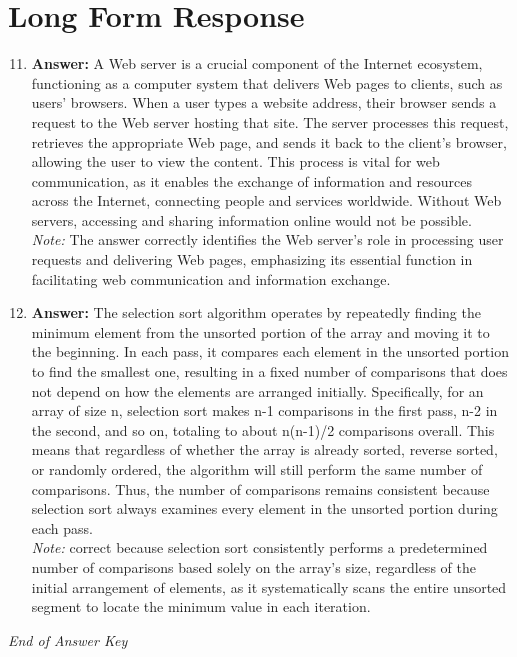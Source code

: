 \documentclass[12pt]{article}
\begin{document}
\section*{Long Form Response}
\begin{enumerate}[label=\arabic*.]
\setcounter{enumi}{10}
\item \textbf{Answer:} A Web server is a crucial component of the Internet ecosystem, functioning as a computer system that delivers Web pages to clients, such as users' browsers. When a user types a website address, their browser sends a request to the Web server hosting that site. The server processes this request, retrieves the appropriate Web page, and sends it back to the client's browser, allowing the user to view the content. This process is vital for web communication, as it enables the exchange of information and resources across the Internet, connecting people and services worldwide. Without Web servers, accessing and sharing information online would not be possible.
\\ \textit{Note:} The answer correctly identifies the Web server's role in processing user requests and delivering Web pages, emphasizing its essential function in facilitating web communication and information exchange.
\item \textbf{Answer:} The selection sort algorithm operates by repeatedly finding the minimum element from the unsorted portion of the array and moving it to the beginning. In each pass, it compares each element in the unsorted portion to find the smallest one, resulting in a fixed number of comparisons that does not depend on how the elements are arranged initially. Specifically, for an array of size n, selection sort makes n-1 comparisons in the first pass, n-2 in the second, and so on, totaling to about n(n-1)/2 comparisons overall. This means that regardless of whether the array is already sorted, reverse sorted, or randomly ordered, the algorithm will still perform the same number of comparisons. Thus, the number of comparisons remains consistent because selection sort always examines every element in the unsorted portion during each pass.
\\ \textit{Note:} correct because selection sort consistently performs a predetermined number of comparisons based solely on the array's size, regardless of the initial arrangement of elements, as it systematically scans the entire unsorted segment to locate the minimum value in each iteration.
\end{enumerate}

\vfill
\noindent\textit{End of Answer Key}
\end{document}
